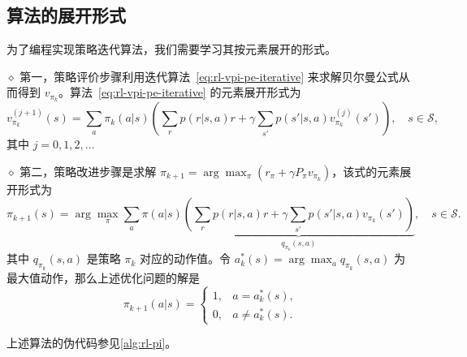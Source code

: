 \subsection{算法的展开形式}
\label{sec:rl-vpi-pi-elementwise}

为了编程实现策略迭代算法，我们需要学习其按元素展开的形式。

$\diamond$ 第一，策略评价步骤利用迭代算法~\eqref{eq:rl-vpi-pe-iterative} 来求解贝尔曼公式从而得到 $v_{\pi_k}$。算法~\eqref{eq:rl-vpi-pe-iterative} 的元素展开形式为
\begin{equation}
v_{\pi_{k}}^{(j+1)}(s) = \sum_{a} \pi_{k}(a|s) \left(\sum_{r} p(r|s,a) r + \gamma \sum_{s'} p(s'|s,a) v_{\pi_{k}}^{(j)}(s')\right), \quad s \in \mathcal{S},
\end{equation}
其中 $j = 0, 1, 2, \ldots$

$\diamond$ 第二，策略改进步骤是求解 $\pi_{k+1} = \arg\max_{\pi}(r_{\pi} + \gamma P_{\pi} v_{\pi_{k}})$，该式的元素展开形式为
\begin{equation}
\pi_{k+1}(s) = \arg\max_{\pi} \sum_{a} \pi(a|s) \underbrace{\left(\sum_{r} p(r|s,a) r + \gamma \sum_{s'} p(s'|s,a) v_{\pi_{k}}(s')\right)}_{q_{\pi_{k}}(s,a)}, \quad s \in \mathcal{S}.
\end{equation}
其中 $q_{\pi_k}(s,a)$ 是策略 $\pi_k$ 对应的动作值。令 $a_k^{*}(s) = \arg\max_{a} q_{\pi_k}(s,a)$ 为最大值动作，那么上述优化问题的解是
\begin{equation}
\pi_{k+1}(a|s) = \begin{cases} 1, & a = a_{k}^{*}(s), \\ 0, & a \neq a_{k}^{*}(s). \end{cases}
\end{equation}

上述算法的伪代码参见\cref{alg:rl-pi}。

